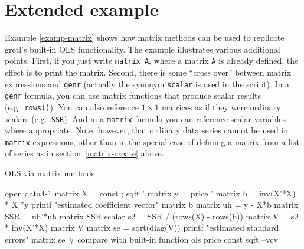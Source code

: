 \section{Extended example}
\label{matrix-example}

Example \ref{examp-matrix} shows how matrix methods can be used to
replicate gretl's built-in OLS functionality.  The example illustrates
various additional points.  First, if you just write \texttt{matrix
  A}, where a matrix \texttt{A} is already defined, the effect is to
print the matrix.  Second, there is some ``cross over'' between matrix
expressions and \texttt{genr} (actually the synonym \texttt{scalar} is
used in the script).  In a \texttt{genr} formula, you can use matrix
functions that produce scalar results (e.g.\ \texttt{rows()}).  You
can also reference $1\times 1$ matrices as if they were ordinary
scalars (e.g.\ \texttt{SSR}).  And in a \texttt{matrix} formula you
can reference scalar variables where appropriate.  Note, however, that
ordinary data series cannot be used in \texttt{matrix} expressions,
other than in the special case of defining a matrix from a list of
series as in section~\ref{matrix-create} above.

\begin{script}[htbp]
  \caption{OLS via matrix methods}
  \label{examp-matrix}
\begin{code}
  open data4-1
  matrix X = { const ; sqft }'
  matrix y = { price }'
  matrix b = inv(X'*X) * X'*y
  printf "estimated coefficient vector\n"
  matrix b
  matrix uh = y - X*b
  matrix SSR = uh'*uh
  matrix SSR
  scalar s2 = SSR / (rows(X) - rows(b))
  matrix V = s2 * inv(X'*X)
  matrix V
  matrix se = sqrt(diag(V))
  printf "estimated standard errors\n"
  matrix se
  # compare with built-in function
  ols price const sqft --vcv
\end{code}
\end{script}




















